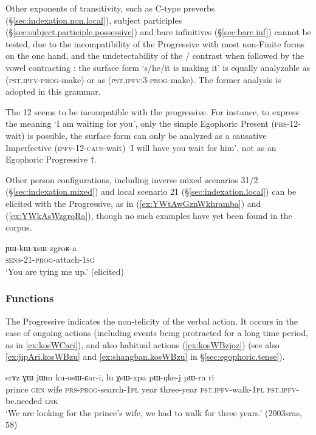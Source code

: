 Other exponents of transitivity, such as C-type preverbs (§\ref{sec:indexation.non.local}), subject participles (§\ref{sec:subject.participle.possessive}) and bare infinitives (§\ref{sec:bare.inf}) cannot be tested, due to the incompatibility of the Progressive with most non-Finite forms on the one hand, and the undetectability of the / contrast when followed by the vowel contracting : the surface form  `s/he/it is making it' is equally analyzable as  (\textsc{pst}.\textsc{ipfv}-\textsc{prog}-make) or as  (\textsc{pst}.\textsc{ipfv}:3\flobv{}-\textsc{prog}-make). The former analysis is adopted in this grammar.

The 1\fl{}2  seems to be incompatible with the progressive. For instance, to express the meaning `I am waiting for you', only the simple Egophoric Present  (\textsc{prs}-1\fl{}2-wait) is possible, the surface form  can only be analyzed as a causative Imperfective  (\textsc{ipfv}-1\fl{}2-\textsc{caus}-wait) `I will have you wait for him', not as an Egophoric Progressive $\dagger$.

Other person configurations, including inverse mixed scenarios 3\fl{}1/2 (§\ref{sec:indexation.mixed}) and local scenario 2\fl{}1 (§\ref{sec:indexation.local}) can be elicited with the Progressive, as in (\ref{ex:YWtAwGznWkhramba}) and (\ref{ex:YWkAsWzgroRa}), though no such examples have yet been found in the corpus.

\begin{exe}
\ex \label{ex:YWkAsWzgroRa}
\gll ɲɯ-kɯ-ɤsɯ-zgroʁ-a \\
\textsc{sens}-2\fl{}1-\textsc{prog}-attach-\textsc{1sg} \\
\glt `You are tying me up.' (elicited)
 \end{exe}
 
\subsubsection{Functions} \label{sec:progressive.function}
The Progressive indicates the non-telicity of the verbal action. It occurs in the case of ongoing actions (including events being protracted for a long time period, as in \ref{ex:kosWCari}), and also habitual actions (\ref{ex:kosWBzjoz}) (see also \ref{ex:jipAri.kosWBzu} and \ref{ex:shangban.kosWBzu} in §\ref{sec:egophoric.tense}).

\begin{exe}
\ex \label{ex:kosWCari}
\gll srɤz ɣɯ jɯm ku-osɯ-ɕar-i, lu χsɯ-xpa pɯ-ŋke-j pɯ-ra ri  \\
prince \textsc{gen} wife \textsc{prs}-\textsc{prog}-search-\textsc{1pl} year three-year \textsc{pst}.\textsc{ipfv}-walk-\textsc{1pl} \textsc{pst}.\textsc{ipfv}-be.needed \textsc{lnk} \\
\glt `We are looking for the prince's wife, we had to walk for three years.'  (2003sras, 58)
 \end{exe}
 
